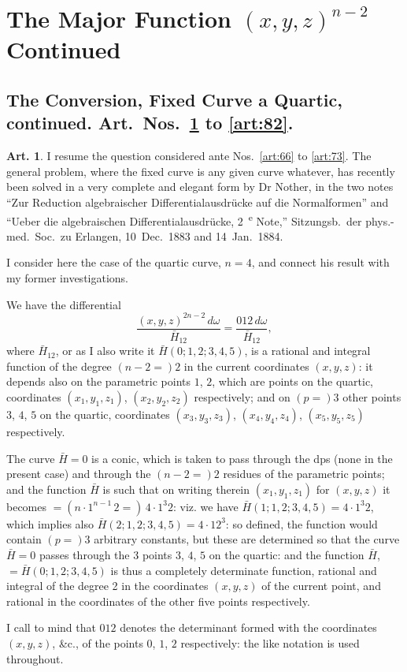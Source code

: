 \documentclass[12pt,a4paper]{article}
\theoremstyle{definition}
\newtheorem{art}{Art.}[section]
\begin{document}
\newpage
\section*{The Major Function $(x, y, z)^{n-2}$ Continued}

\subsection*{The Conversion, Fixed Curve a Quartic, continued. Art.~Nos.~\ref{art:74} to \ref{art:82}.}

\begin{art}\label{art:74}
I resume the question considered ante Nos.~\ref{art:66} to \ref{art:73}. The general problem, where the fixed curve is any given curve whatever, has recently been solved in a very complete and elegant form by Dr Nother, in the two notes ``Zur Reduction algebraischer Differentialausdr\"ucke auf die Normalformen'' and ``Ueber die algebraischen Differentialausdr\"ucke, 2~\textsuperscript{e} Note,'' Sitzungsb.\ der phys.-med.\ Soc.\ zu Erlangen, 10~Dec.\ 1883 and 14~Jan.\ 1884.

I consider here the case of the quartic curve, $n = 4$, and connect his result with my former investigations.

We have the differential
\[
\frac{(x, y, z)^{2n-2}\,d\omega}{\bar{H}_{12}} = \frac{012\,d\omega}{\bar{H}_{12}},
\]
where $\bar{H}_{12}$, or as I also write it $\bar{H}(0; 1, 2; 3, 4, 5)$, is a rational and integral function of the degree $(n - 2 =) 2$ in the current coordinates $(x, y, z)$: it depends also on the parametric points $1$, $2$, which are points on the quartic, coordinates $(x_1, y_1, z_1)$, $(x_2, y_2, z_2)$ respectively; and on $(p =) 3$ other points $3$, $4$, $5$ on the quartic, coordinates $(x_3, y_3, z_3)$, $(x_4, y_4, z_4)$, $(x_5, y_5, z_5)$ respectively.

The curve $\bar{H} = 0$ is a conic, which is taken to pass through the dps (none in the present case) and through the $(n - 2 =) 2$ residues of the parametric points; and the function $\bar{H}$ is such that on writing therein $(x_1, y_1, z_1)$ for $(x, y, z)$ it becomes $= (n \cdot 1^{n-1}\,2 =)\, 4 \cdot 1^3 2$: viz. we have $\bar{H}(1; 1, 2; 3, 4, 5) = 4 \cdot 1^3 2$, which implies also $\bar{H}(2; 1, 2; 3, 4, 5) = 4 \cdot 12^3$: so defined, the function would contain $(p =) 3$ arbitrary constants, but these are determined so that the curve $\bar{H} = 0$ passes through the 3 points $3$, $4$, $5$ on the quartic: and the function $\bar{H}$, $= \bar{H}(0; 1, 2; 3, 4, 5)$ is thus a completely determinate function, rational and integral of the degree 2 in the coordinates $(x, y, z)$ of the current point, and rational in the coordinates of the other five points respectively.

I call to mind that $012$ denotes the determinant formed with the coordinates $(x, y, z)$, \&c., of the points $0$, $1$, $2$ respectively: the like notation is used throughout.
\end{art}
\end{document}
